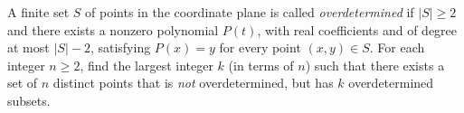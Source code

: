 A finite set $S$ of points in the coordinate plane is called \emph{overdetermined} if $|S|\geq2$ and there exists a nonzero polynomial $P(t)$, with real coefficients and of degree at most $|S|-2$, satisfying $P(x)=y$ for every point $(x,y)\in S$. For each integer $n\geq2$, find the largest integer $k$ (in terms of $n$) such that there exists a set of $n$ distinct points that is \emph{not} overdetermined, but has $k$ overdetermined subsets.